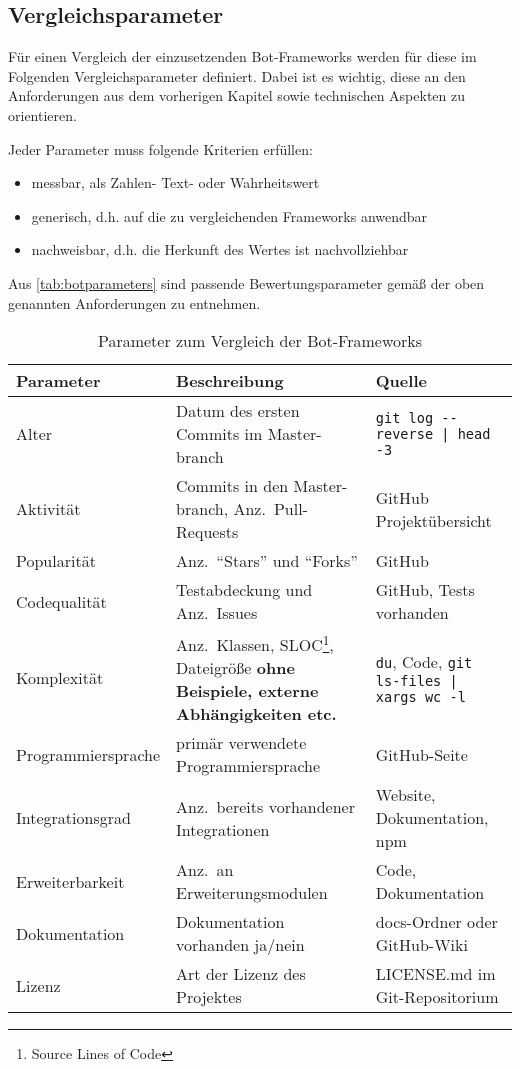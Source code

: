 
\subsection{Vergleichsparameter}
Für einen Vergleich der einzusetzenden Bot-Frameworks werden für diese im Folgenden Vergleichsparameter definiert. Dabei ist es wichtig, diese an den Anforderungen aus dem vorherigen Kapitel sowie technischen Aspekten zu orientieren.

Jeder Parameter muss folgende Kriterien erfüllen:

\begin{itemize}
    \item messbar, als Zahlen- Text- oder Wahrheitswert
    \item generisch, d.h. auf die zu vergleichenden Frameworks anwendbar
    \item nachweisbar, d.h. die Herkunft des Wertes ist nachvollziehbar
\end{itemize}

Aus \autoref{tab:botparameters} sind passende Bewertungsparameter gemäß der oben genannten Anforderungen zu entnehmen.

\begin{table}[htbp]
    \begin{tabularx}{\textwidth}{lXp{6cm}}
   \hline
   \textbf{Parameter} & \textbf{Beschreibung} & \textbf{Quelle} \\
   \hline
   Alter & Datum des ersten Commits im Master-branch & \verb+git log --reverse | head -3+\\
   \hline
   Aktivität & Commits in den Master-branch, Anz.\ Pull-Requests & GitHub Projektübersicht \\
   \hline
   Popularität & Anz.\ \enquote{Stars} und \enquote{Forks} & GitHub \\
    \hline
   Codequalität & Testabdeckung und Anz.\ Issues & GitHub, Tests vorhanden \\
   \hline
   Komplexität & Anz.\ Klassen, SLOC\footnote{Source Lines of Code}, Dateigröße \textbf{ohne Beispiele, externe Abhängigkeiten etc.} & \verb+du+, Code, \verb+git ls-files | xargs wc -l+ \\
   \hline
   Programmiersprache & primär verwendete Programmiersprache & GitHub-Seite \\
   \hline
   Integrationsgrad & Anz.\ bereits vorhandener Integrationen & Website, Dokumentation, npm \\
   \hline
   Erweiterbarkeit & Anz.\ an Erweiterungsmodulen & Code, Dokumentation \\
   \hline
   Dokumentation & Dokumentation vorhanden ja/nein & docs-Ordner oder GitHub-Wiki \\
   \hline
   Lizenz & Art der Lizenz des Projektes & LICENSE.md im Git-Repositorium \\
   \hline
\end{tabularx}
\caption{Parameter zum Vergleich der Bot-Frameworks}
\label{tab:botparameters}
\end{table}

